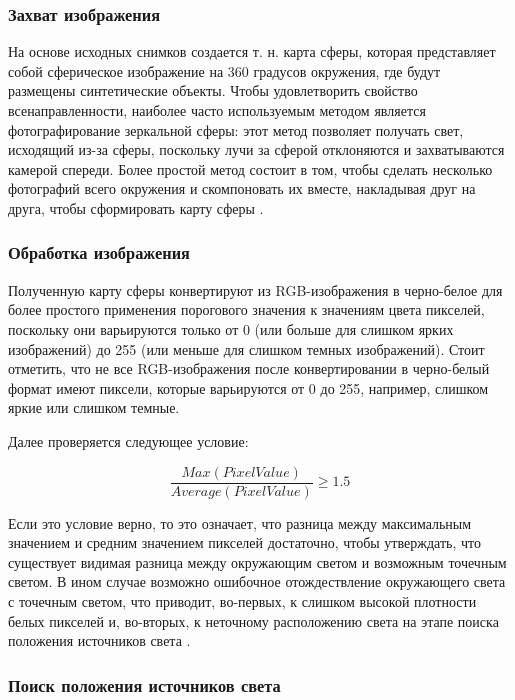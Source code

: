 \subsubsection*{Захват изображения}

На основе исходных снимков создается т. н. карта сферы, которая представляет собой сферическое изображение на 360 градусов окружения, где будут размещены синтетические объекты. Чтобы удовлетворить свойство всенаправленности, наиболее часто используемым методом является фотографирование зеркальной сферы: этот метод позволяет получать свет, исходящий из-за сферы, поскольку лучи за сферой отклоняются и захватываются камерой спереди. Более простой метод состоит в том, чтобы сделать несколько фотографий всего окружения и скомпоновать их вместе, накладывая друг на друга, чтобы сформировать карту сферы \cite{rtsm}.

\subsubsection*{Обработка изображения}

Полученную карту сферы конвертируют из RGB-изображения в черно-белое для более простого применения порогового значения к
значениям цвета пикселей, поскольку они варьируются только от 0 (или больше для слишком ярких изображений) до 255 (или меньше для слишком темных изображений). Стоит отметить, что не все RGB-изображения после конвертировании в черно-белый формат имеют пиксели, которые варьируются от 0 до 255, например, слишком яркие или слишком темные.

Далее проверяется следующее условие:

\begin{equation}
	\frac{Max(PixelValue)}{Average(PixelValue)} \geq 1.5
\end{equation}

Если это условие верно, то это означает, что разница между максимальным значением и средним значением пикселей достаточно, чтобы утверждать, что существует видимая разница между окружающим светом и возможным точечным светом. В ином случае возможно ошибочное отождествление окружающего света с точечным светом, что приводит, во-первых, к слишком высокой плотности белых пикселей и, во-вторых, к неточному расположению света на этапе поиска положения источников света \cite{rtsm}.

\subsubsection*{Поиск положения источников света}



